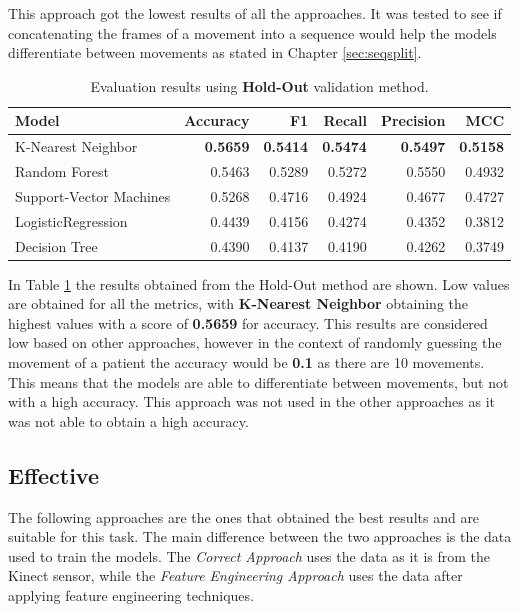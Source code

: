                 This approach got the lowest results of all the approaches. It was tested to see if concatenating the frames of a movement into a sequence would help the models differentiate between movements as stated in Chapter \ref{sec:seqsplit}.
                
                \begin{table}[htbp]
                    \centering
                    \caption{Evaluation results using \textbf{Hold-Out} validation method.}
                    \label{tab:sequence_approach_holdout}
                    \begin{tabular}{lrrrrr}
                        \toprule
                        \textbf{Model} & \textbf{Accuracy} & \textbf{F1} & \textbf{Recall} & \textbf{Precision} & \textbf{MCC} \\
                        \midrule
                        K-Nearest Neighbor & \textbf{0.5659} & \textbf{0.5414} & \textbf{0.5474} & \textbf{0.5497} & \textbf{0.5158} \\
                        Random Forest & 0.5463 & 0.5289 & 0.5272 & 0.5550 & 0.4932 \\
                        Support-Vector Machines & 0.5268 & 0.4716 & 0.4924 & 0.4677 & 0.4727 \\
                        LogisticRegression & 0.4439 & 0.4156 & 0.4274 & 0.4352 & 0.3812 \\
                        Decision Tree & 0.4390 & 0.4137 & 0.4190 & 0.4262 & 0.3749 \\
                        \bottomrule
                    \end{tabular}
                \end{table}

                In Table \ref{tab:sequence_approach_holdout} the results obtained from the Hold-Out method are shown. Low values are obtained for all the metrics, with \textbf{K-Nearest Neighbor} obtaining the highest values with a score of \textbf{0.5659} for accuracy. This results are considered low based on other approaches, however in the context of randomly guessing the movement of a patient the accuracy would be \textbf{0.1} as there are 10 movements. This means that the models are able to differentiate between movements, but not with a high accuracy. This approach was not used in the other approaches as it was not able to obtain a high accuracy.

        \subsection{Effective}
                The following approaches are the ones that obtained the best results and are suitable for this task. The main difference between the two approaches is the data used to train the models. The \textit{Correct Approach} uses the data as it is from the Kinect sensor, while the \textit{Feature Engineering Approach} uses the data after applying feature engineering techniques.
                
